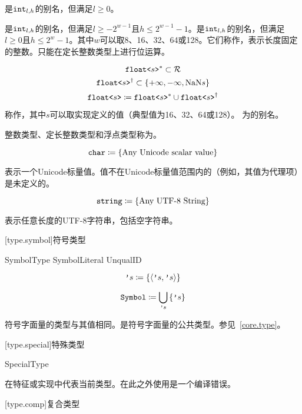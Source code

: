 是$\texttt{int}_{l,h}$的别名，但满足$l\ge0$。

\pnum
{}是$\texttt{int}_{l,h}$的别名，但满足$l\ge-2^{w-1}$且$h\le2^{w-1}-1$。是$\texttt{int}_{l,h}$的别名，但满足$l\ge0$且$h\le2^w-1$。其中$w$可以取8、16、32、64或128。它们称作，表示长度固定的整数。只能在定长整数类型上进行位运算。

$$ \texttt{float<}s\texttt{>}^\ast \subset \mathcal{R} $$
$$ \texttt{float<}s\texttt{>}^\dagger \subset \{ +\infty, -\infty, \mathrm{NaN}s \} $$
$$ \texttt{float<}s\texttt{>} \coloneqq \texttt{float<}s\texttt{>}^\ast \cup \texttt{float<}s\texttt{>}^\dagger $$

\pnum
{}称作，其中$s$可以取实现定义的值（典型值为16、32、64或128）。
为的别名。

\pnum
整数类型、定长整数类型和浮点类型称为。

$$\texttt{char} \coloneqq \left\{ \textnormal{Any Unicode scalar value} \right\}$$

\pnum
{}表示一个Unicode标量值。值不在Unicode标量值范围内的（例如，其值为代理项）是未定义的。

$$\texttt{string} \coloneqq \left\{ \textnormal{Any UTF-8 String} \right\} $$

\pnum
{}表示任意长度的UTF-8字符串，包括空字符串。

[type.symbol]{符号类型}

\begin{bnf}{SymbolType}
    SymbolLiteral \br
     UnqualID \terminal{)}
\end{bnf}

$$ \texttt{'}s \coloneqq \left\{ \langle \texttt{'}s, \texttt{'}s \rangle \right\} $$

$$ \texttt{Symbol} \coloneqq \bigcup_{\texttt{'}s} \left\{  \texttt{'}s \right\} $$

\pnum
符号字面量的类型与其值相同。是符号字面量的公共类型。参见~\ref{core.type}。

[type.special]{特殊类型}

\begin{bnf}{SpecialType}
\end{bnf}

\pnum
{}在特征或实现中代表当前类型。在此之外使用是一个编译错误。

[type.comp]{复合类型}

